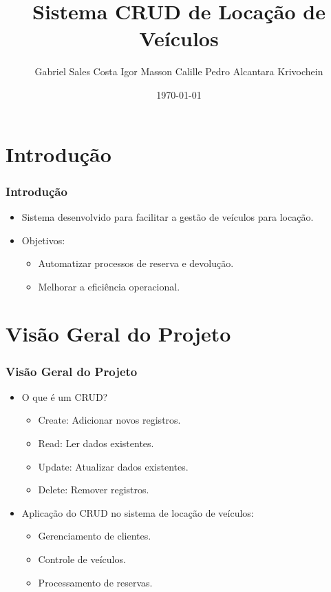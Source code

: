 \documentclass[aspectratio=169,xcolor=dvipsnames]{beamer}
\title[]{Sistema CRUD de Locação de Veículos}
\author{Gabriel Sales Costa \newline Igor Masson Calille \newline Pedro Alcantara Krivochein}
\institute[PUC-SP]{Pontifícia Universidade Católica de São Paulo}
\date{\today}
\begin{document}
\frame{\titlepage}

\section{Introdução}
\begin{frame}
\frametitle{Introdução}
\begin{itemize}
    \item Sistema desenvolvido para facilitar a gestão de veículos para locação.
    \item Objetivos:
    \begin{itemize}
        \item Automatizar processos de reserva e devolução.
        \item Melhorar a eficiência operacional.
    \end{itemize}
\end{itemize}
\end{frame}

\section{Visão Geral do Projeto}
\begin{frame}
\frametitle{Visão Geral do Projeto}
\begin{itemize}
    \item O que é um CRUD?
    \begin{itemize}
        \item Create: Adicionar novos registros.
        \item Read: Ler dados existentes.
        \item Update: Atualizar dados existentes.
        \item Delete: Remover registros.
    \end{itemize}
    \item Aplicação do CRUD no sistema de locação de veículos:
    \begin{itemize}
        \item Gerenciamento de clientes.
        \item Controle de veículos.
        \item Processamento de reservas.
    \end{itemize}
\end{itemize}
\end{frame}
\end{document}
